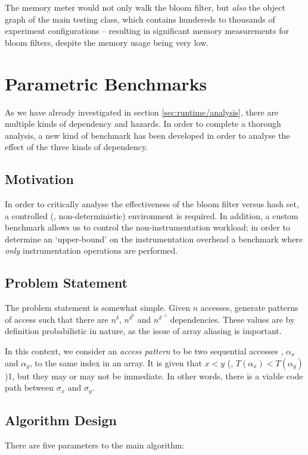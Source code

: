 	The memory meter would not only walk the bloom filter, but \emph{also} the object graph of the main testing class, which contains hundereds to thousands of experiment configurations -- resulting in significant memory measurements for bloom filters, despite the memory usage being very low.
	
\section{Parametric Benchmarks} \label{sec:methodology/params}
As we have already investigated in section \ref{sec:runtime/analysis}, there are multiple kinds of dependency and hazards. In order to complete a thorough analysis, a new kind of benchmark has been developed in order to analyse the effect of the three kinds of dependency.

	\subsection{Motivation} \label{sec:methodology/params/motivation}
	In order to critically analyse the effectiveness of the bloom filter versus hash set, a controlled (\ie, non-deterministic) environment is required. In addition, a custom benchmark allows us to control the non-instrumentation workload; in order to determine an `upper-bound' on the instrumentation overhead a benchmark where \emph{only} instrumentation operations are performed. 

	\subsection{Problem Statement} \label{sec:methodology/params/problem}
	The problem statement is somewhat simple. Given $n$ accesses, generate patterns of access such that there are $n^{\delta}$, $n^{\delta^{0}}$ and $n^{\delta^{-1}}$ dependencies. These values are by definition probabilistic in nature, as the issue of array aliasing is important.
	
	In this context, we consider an \textit{access pattern} to be two sequential accesses , $\alpha_x$ and $\alpha_y$, to the same index in an array. It is given that $x < y$ (\ie, $T(\alpha_x) < T(\alpha_y)$)1, but they may or may not be immediate. In other words, there is a viable code path between $\sigma_x$ and $\sigma_y$.
	
	\subsection{Algorithm Design} \label{sec:methodology/params/algo}
	There are five parameters to the main algorithm:
	
